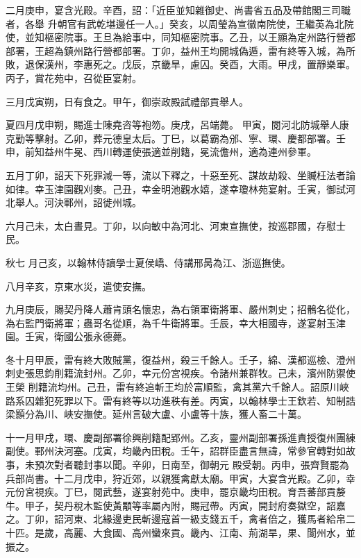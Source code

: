 \begin{pinyinscope}
 二月庚申，宴含光殿。辛酉，詔：「近臣並知雜御史、尚書省五品及帶館閣三司職者，各舉
 升朝官有武乾堪邊任一人。」癸亥，以周瑩為宣徽南院使，王繼英為北院使，並知樞密院事。王旦為給事中，同知樞密院事。乙丑，以王顯為定州路行營都部署，王超為鎮州路行營都部署。丁卯，益州王均開城偽遁，雷有終等入城，為所敗，退保漢州，李惠死之。戊辰，京畿旱，慮囚。癸酉，大雨。甲戌，置靜樂軍。丙子，賞花苑中，召從臣宴射。



 三月戊寅朔，日有食之。甲午，御崇政殿試禮部貢舉人。



 夏四月戊申朔，賜進士陳堯咨等袍笏。庚戌，呂端薨。
 甲寅，閱河北防城舉人康克勤等擊射。乙卯，葬元德皇太后。丁巳，以葛霸為邠、寧、環、慶都部署。壬申，前知益州牛冕、西川轉運使張適並削籍，冕流儋州，適為連州參軍。



 五月丁卯，詔天下死罪減一等，流以下釋之，十惡至死、謀故劫殺、坐贓枉法者論如律。幸玉津園觀刈麥。己丑，幸金明池觀水嬉，遂幸瓊林苑宴射。壬寅，御試河北舉人。河決鄆州，詔徙州城。



 六月己未，太白晝見。丁卯，以向敏中為河北、河東宣撫使，按巡郡國，存慰士民。



 秋七
 月己亥，以翰林侍讀學士夏侯嶠、侍講邢昺為江、浙巡撫使。



 八月辛亥，京東水災，遣使安撫。



 九月庚辰，賜契丹降人蕭肯頭名懷忠，為右領軍衛將軍、嚴州刺史；招鶻名從化，為右監門衛將軍；蟲哥名從順，為千牛衛將軍。壬辰，幸大相國寺，遂宴射玉津園。壬寅，衛國公張永德薨。



 冬十月甲辰，雷有終大敗賊黨，復益州，殺三千餘人。壬子，綿、漢都巡檢、澄州刺史張思鈞削籍流封州。乙卯，幸元份宮視疾。令諸州兼群牧。己未，濱州防禦使王榮
 削籍流均州。己丑，雷有終追斬王均於富順監，禽其黨六千餘人。詔原川峽路系囚雜犯死罪以下。雷有終等以功進秩有差。丙寅，以翰林學士王欽若、知制誥梁顥分為川、峽安撫使。延州言破大盧、小盧等十族，獲人畜二十萬。



 十一月甲戌，環、慶副部署徐興削籍配郢州。乙亥，靈州副部署孫進責授復州團練副使。鄆州決河塞。戊寅，均畿內田稅。壬午，詔群臣盡言無諱，常參官轉對如故事，未預次對者聽封事以聞。辛卯，日南至，御朝元
 殿受朝。丙申，張齊賢罷為兵部尚書。十二月戊申，狩近郊，以親獲禽獻太廟。甲寅，大宴含光殿。乙卯，幸元份宮視疾。丁巳，閱武藝，遂宴射苑中。庚申，罷京畿均田稅。育吾蕃部貢嫠牛。甲子，契丹稅木監使黃顒等率屬內附，賜冠帶。丙寅，開封府奏獄空，詔嘉之。丁卯，詔河東、北緣邊吏民斬邊寇首一級支錢五千，禽者倍之，獲馬者給帛二十匹。是歲，高麗、大食國、高州蠻來貢。畿內、江南、荊湖旱，果、閬州水，並振之。




\end{pinyinscope}
